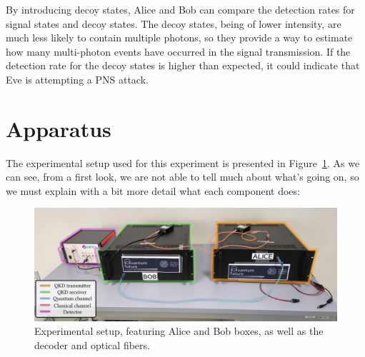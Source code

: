 \documentclass[prl,twocolumn]{revtex4-1}
\begin{document}
By introducing decoy states, Alice and Bob can compare the detection rates for signal states and decoy states. The decoy states, being of lower intensity, are much less likely to contain multiple photons, so they provide a way to estimate how many multi-photon events have occurred in the signal transmission. If the detection rate for the decoy states is higher than expected, it could indicate that Eve is attempting a PNS attack.


\section{Apparatus}
The experimental setup used for this experiment is presented in Figure~\ref{fig:setup}. As we can see, from a first look, we are not able to tell much about what's going on, so we must explain with a bit more detail what each component does:


\begin{figure}[!b]
    \centering
    \includegraphics[width=\linewidth]{Images/setup.png}
    \caption{Experimental setup, featuring Alice and Bob boxes, as well as the decoder and optical fibers.}
    \label{fig:setup}
\end{figure}
\end{document}
